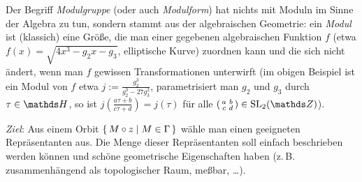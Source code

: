 \begin{beme}
Der Begriff \emph{Modulgruppe} (oder auch \emph{Modulform}) hat nichts mit Moduln im Sinne der Algebra zu tun, sondern stammt aus der algebraischen Geometrie:
ein \emph{Modul} ist (klassich) eine Größe, die man einer gegebenen algebraischen Funktion $f$ (etwa $f(x) = \sqrt{4x^3 - g_2x-g_3}$, elliptische Kurve) zuordnen kann und die sich nicht ändert, wenn man $f$ gewissen Transformationen unterwirft (im obigen Beispiel ist ein Modul von $f$ etwa $j := \frac{g_2^3}{g_2^3-27g_3^2}$, parametrisiert man $g_2$ und $g_3$ durch $\tau\in\HH$, so ist $j(\frac{a\tau+b}{c\tau+d}) = j(\tau)$ für alle $(\begin{smallmatrix}a&b\\c&d\end{smallmatrix}) \in \SL_2(\ZZ)$).
\end{beme}

\emph{Ziel}: Aus einem Orbit $\left\{\,M \circ z \mid M \in \Gamma\,\right\}$ wähle man einen geeigneten Repräsentanten aus.
Die Menge dieser Repräsentanten soll einfach beschrieben werden können und schöne geometrische Eigenschaften haben (z.\,B. zusammenhängend als topologischer Raum, meßbar, \ldots).